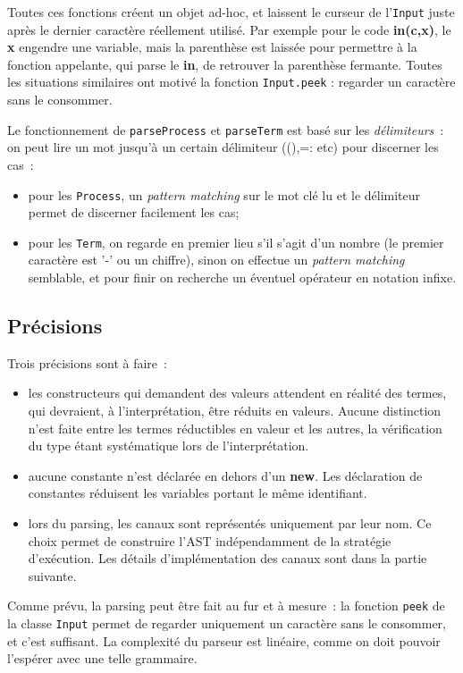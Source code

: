 \documentclass[11pt]{article} %
\begin{document}
Toutes ces fonctions créent un objet ad-hoc, et laissent le curseur de l'\texttt{Input} juste après le dernier caractère réellement utilisé. Par exemple pour le code \textbf{in(c,x)}, le \textbf{x} engendre une variable, mais la parenthèse est laissée pour permettre à la fonction appelante, qui parse le \textbf{in}, de retrouver la parenthèse fermante. Toutes les situations similaires ont motivé la fonction \texttt{Input.peek} : regarder un caractère sans le consommer.

Le fonctionnement de \texttt{parseProcess} et \texttt{parseTerm} est basé sur les \emph{délimiteurs}~: on peut lire un mot jusqu'à un certain délimiteur ((),=: etc) pour discerner les cas~:
\begin{itemize}
\item pour les \texttt{Process}, un \emph{pattern matching} sur le mot clé lu et le délimiteur permet de discerner facilement les cas;
\item pour les \texttt{Term}, on regarde en premier lieu s'il s'agit d'un nombre (le premier caractère est '-' ou un chiffre), sinon on effectue un \emph{pattern matching} semblable, et pour finir on recherche un éventuel opérateur en notation infixe.
\end{itemize}

\subsection{Précisions}

Trois précisions sont à faire~:
\begin{itemize}
\item les constructeurs qui demandent des valeurs attendent en réalité des termes, qui devraient, à l'interprétation, être réduits en valeurs. Aucune distinction n'est faite entre les termes réductibles en valeur et les autres, la vérification du type étant systématique lors de l'interprétation.
\item aucune constante n'est déclarée en dehors d'un \textbf{new}. Les déclaration de constantes réduisent les variables portant le même identifiant.
\item lors du parsing, les canaux sont représentés uniquement par leur nom. Ce choix permet de construire l'AST indépendamment de la stratégie d'exécution. Les détails d'implémentation des canaux sont dans la partie suivante.
\end{itemize}

Comme prévu, la parsing peut être fait au fur et à mesure~: la fonction \texttt{peek} de la classe \texttt{Input} permet de regarder uniquement un caractère sans le consommer, et c'est suffisant. La complexité du parseur est linéaire, comme on doit pouvoir l'espérer avec une telle grammaire.
\end{document}
